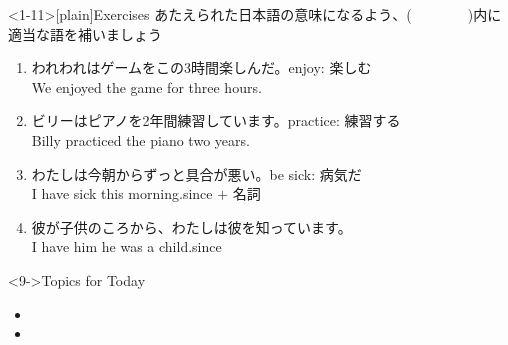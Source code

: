 \documentclass[aspectratio=169,xcolor={dvipsnames,table}]{beamer}
\newcommand{\myaudio}[1]{\href{#1}{\faVolumeUp}}
\begin{document}
\begin{frame}<1-11>[plain]{Exercises}
あたえられた日本語の意味になるよう、(~~~~~~~~)内に適当な語を補いましょう\mbox{}\hfill\myaudio{./audio/012_have_pp_keizoku_05.mp3}

\begin{enumerate}
 \item {\small われわれはゲームをこの3時間楽しんだ。}\hfill{}{\scriptsize enjoy: 楽しむ}\\
We  enjoyed the game for three hours. \item {\small ビリーはピアノを2年間練習しています。}\hfill{}{\scriptsize practice: 練習する}\\
Billy  practiced the piano  two years.
 \item {\small わたしは今朝からずっと具合が悪い。}\hfill{}{\scriptsize be sick: 病気だ}\\
I have  sick  this morning.\hfill{\small since $+$ 名詞}
 \item {\small 彼が子供のころから、わたしは彼を知っています。}\\
I have  him  he was a child.\hfill{\small since }
\end{enumerate}

\begin{exampleblock}<9->{Topics for Today}\small
\begin{itemize}[square]
 \item {}
 \item {}

\end{itemize}
      \end{exampleblock}
\end{frame}
\end{document}
